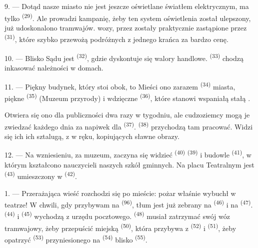 9. --- Dotąd nasze miasto nie jest jeszcze oświetlane światłem elektrycznym, ma tylko
 \textsuperscript{(29)}. Ale  prowadzi
kampanię, żeby ten system oświetlenia został ulepszony,  już udoskonalono
 tramwajów.  wozy,  przez
 zostały praktycznie zastąpione przez 
\textsuperscript{(31)}, które szybko przewożą podróżnych z jednego krańca  za bardzo  cenę.

10. --- Blisko Sądu jest  \textsuperscript{(32)}, gdzie dyskontuje się walory
handlowe.  \textsuperscript{(33)} chodzą inkasować należności w
domach.

\VUsaut{4.0mm}
\VUsaut{3.4mm}

11. --- Piękny budynek, który stoi obok, to  Mieści ono zarazem
 \textsuperscript{(34)} miasta, piękne  \textsuperscript{(35)} (Muzeum przyrody) i wdzięczne  \textsuperscript{(36)}, które stanowi wspaniałą stałą .

Otwiera się ono dla publiczności dwa razy w tygodniu, ale cudzoziemcy mogą je zwiedzać
każdego dnia za napiwek dla  \textsuperscript{(37)}.
 \textsuperscript{(38)} przychodzą tam pracować. Widzi się ich
 ich sztalugą, z  w ręku, kopiujących sławne obrazy.

12. --- Na wzniesieniu, za muzeum, zaczyna się widzieć 
\textsuperscript{(40)}  \textsuperscript{(39)} i budowle
 \textsuperscript{(41)}, w którym kształcono
nauczycieli naszych szkół gminnych. Na placu Teatralnym jest 
\textsuperscript{(43)} umieszczony w  \textsuperscript{(42)}.

\VUsaut{5.0mm}
\VUsaut{3.0mm}

\VUsaut{3.4mm}

1. --- Przerażająca wieść rozchodzi się po mieście: pożar właśnie wybuchł w teatrze! W
chwili, gdy przybywam na  \textsuperscript{(96)}, tłum jest już zebrany na
 \textsuperscript{(46)} i na  \textsuperscript{(47)}.
 \textsuperscript{(44)} i 
\textsuperscript{(45)} wychodzą z urzędu pocztowego. 
\textsuperscript{(48)} musiał zatrzymać swój wóz tramwajowy, żeby przepuścić miejską
 \textsuperscript{(50)}, która przybywa z 
\textsuperscript{(52)} i  \textsuperscript{(51)}, żeby opatrzyć
 \textsuperscript{(53)} przyniesionego na 
\textsuperscript{(54)} blisko  \textsuperscript{(55)}.

